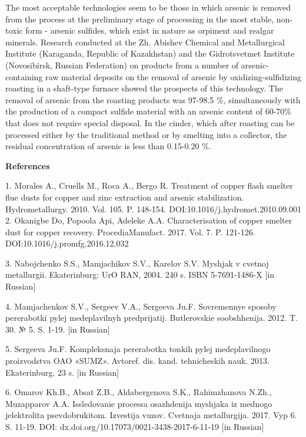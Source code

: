 The most acceptable technologies seem to be those in which arsenic is
removed from the process at the preliminary stage of processing in the
most stable, non-toxic form - arsenic sulfides, which exist in nature as
orpiment and realgar minerals. Research conducted at the Zh. Abishev
Chemical and Metallurgical Institute (Karaganda, Republic of Kazakhstan)
and the Gidrotsvetmet Institute (Novosibirsk, Russian Federation) on
products from a number of arsenic-containing raw material deposits on
the removal of arsenic by oxidizing-sulfidizing roasting in a shaft-type
furnace showed the prospects of this technology. The removal of arsenic
from the roasting products was 97-98.5 \%, simultaneously with the
production of a compact sulfide material with an arsenic content of
60-70\% that does not require special disposal. In the cinder, which
after roasting can be processed either by the traditional method or by
smelting into a collector, the residual concentration of arsenic is less
than 0.15-0.20 \%.

{\bfseries References}

1. Morales A., Cruells M., Roca A., Bergo R. Treatment of copper flash
smelter flue dusts for copper and zinc extraction and arsenic
stabilization. Hydrometallurgy. 2010. Vol. 105. P. 148-154.
DOI:10.1016/j.hydromet.2010.09.001\\
2. Okanigbe Do, Popoola Api, Adeleke A.A. Characterisation of copper
smelter dust for copper recovery. ProcediaManufact. 2017. Vol. 7. P.
121-126. DOI:10.1016/j.promfg.2016.12.032

3. Nabojchenko S.S., Mamjachikov S.V., Karelov S.V.
Mysh\textquotesingle jak v cvetnoj metallurgii. Ekaterinburg: UrO RAN,
2004. 240 s. ISBN 5-7691-1486-X {[}in Russian{]}

4. Mamjachenkov S.V., Sergeev V.A., Sergeeva Ju.F. Sovremennye sposoby
pererabotki pylej medeplavil\textquotesingle nyh predprijatij.
Butlerovskie soobshhenija. 2012. T. 30. № 5. S. 1-19. {[}in Russian{]}

5. Sergeeva Ju.F. Kompleksnaja pererabotka tonkih pylej
medeplavil\textquotesingle nogo proizvodstva OAO «SUMZ». Avtoref. dis.
kand. tehnicheskih nauk. 2013. Ekaterinburg. 23 s. {[}in Russian{]}

6. Omarov Kh.B., Absat Z.B., Aldabergenova S.K., Rahimzhanova N.Zh.,
Muzapparov A.A. Issledovanie processa osazhdenija
mysh\textquotesingle jaka iz mednogo jelektrolita psevdobrukitom.
Izvestija vuzov. Cvetnaja metallurgija. 2017. Vyp 6. S. 11-19. DOI:
dx.doi.org/10.17073/0021-3438-2017-6-11-19 {[}in Russian{]}

